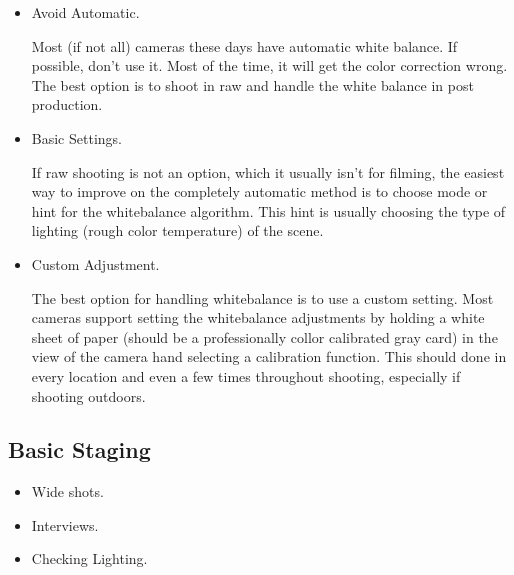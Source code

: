 \documentclass[letterpaper]{latexclasses/tmarticle}
\begin{document}
\begin{itemize}
    \item
    Avoid Automatic.
    
    Most (if not all) cameras these days have automatic white balance.  If
    possible, don't use it.  Most of the time, it will get the color correction
    wrong.  The best option is to shoot in raw and handle the white balance in
    post production.
    
    \item
    Basic Settings.
    
    If raw shooting is not an option, which it usually isn't for filming, the
    easiest way to improve on the completely automatic method is to choose mode
    or hint for the whitebalance algorithm.  This hint is usually choosing the
    type of lighting (rough color temperature) of the scene.
    
    
    \item
    Custom Adjustment.
    
    The best option for handling whitebalance is to use a custom setting.  Most
    cameras support setting the whitebalance adjustments by holding a white
    sheet of paper (should be a professionally collor calibrated gray card) in
    the view of the camera hand selecting a calibration function.  This should
    done in every location and even a few times throughout shooting, especially
    if shooting outdoors.
    

\end{itemize}

\subsection{Basic Staging}

\begin{itemize}
    \item
    Wide shots.
    
    
    
    
    \item
    Interviews.
    
    
    
    \item
    Checking Lighting.
    
    

\end{itemize}
\end{document}
